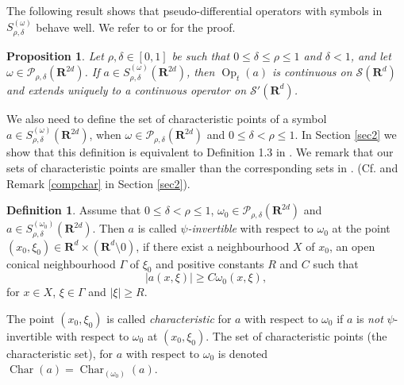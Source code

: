 \documentclass[12pt,a4paper,reqno]{amsart}
\numberwithin{equation}{section}
\numberwithin{thm}{section}
\newtheorem{prop}[thm]{Proposition}
\theoremstyle{definition}
\newtheorem{defn}[thm]{Definition}
\theoremstyle{remark}
\begin{document}
The following result shows that pseudo-differential operators with
symbols in $S^{(\omega )}_{\rho ,\delta}$ behave well. We refer to
\cite {Ho1} or \cite{PTT1} for the proof.

\par

\begin{prop}\label{p5.4}
Let $\rho ,\delta \in [0,1]$ be such that $0\le \delta \le
\rho \le 1$ and $\delta <1$, and let $\omega \in \mathscr P_{\rho ,\delta}
({\mathbf R^{{2d}}})$. If $a\in S^{(\omega )}_{\rho ,\delta} ({\mathbf R^{{2d}}})$, then ${\operatorname{Op}} _t(a)$ is continuous on $\mathscr S({\mathbf R^{d}})$ and
extends uniquely to a continuous operator on $\mathscr S'({\mathbf R^{d}})$.
\end{prop}

\par

We also need to define the set of characteristic points of a symbol
$a\in S^{(\omega )}_{\rho ,\delta} ({\mathbf R^{{2d}}})$, when $\omega \in
\mathscr P_{\rho ,\delta}({\mathbf R^{{2d}}})$ and $0\le \delta < \rho \le
1$. In Section \ref{sec2} we show that this definition is equivalent
to Definition 1.3 in \cite{PTT1}. We remark that our sets of
characteristic points are smaller than the corresponding sets in \cite
{Ho1}. (Cf. \cite[Definition 18.1.5]{Ho1} and Remark
\ref{compchar} in Section \ref{sec2}).

\par

\begin{defn}\label{defchar}
Assume that  $0 \leq \delta < \rho \leq 1$, $\omega _0 \in
\mathscr{P}_{\rho,\delta}({\mathbf R^{{2d}}})$ and $a\in
S^{(\omega_0)}_{\rho,\delta}({\mathbf R^{{2d}}})$. Then $a$ is called
\emph{$\psi$-invertible} with respect to $\omega _0$ at the
point $(x_0,\xi_0)\in {\mathbf R^{d}}\times ({\mathbf R^{d}}{\setminus 0})$, if
there exist a neighbourhood $X$ of $x_0$, an open conical
neighbourhood $\Gamma$ of $\xi_0$ and positive constants $R$ and $C$ such that
\begin{equation}\label{nydef}
|a(x,\xi)|\geq C\omega _0(x,\xi),
\end{equation}
for $x\in X$, $\xi\in \Gamma$ and $|\xi|\geq R$.

\par

The point $(x_0,\xi_0)$ is called \emph{characteristic} for $a$ with
respect to $\omega _0$ if $a$ is \emph{not} $\psi$-invertible 
with respect to $\omega _0$ at $(x_0,\xi_0)$. The set of characteristic points (the
characteristic set), for $a$ with respect to $\omega _0$ is denoted
${\operatorname{Char}}(a)={\operatorname{Char}}_{(\omega _0)}(a)$.
\end{defn}
\end{document}

